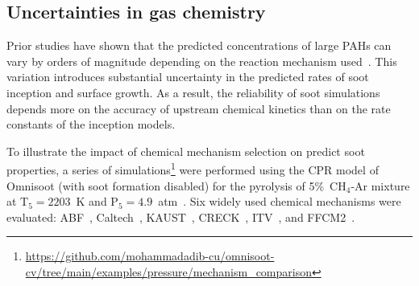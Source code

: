 \subsection{Uncertainties in gas chemistry}
\label{sec:uncergaschem}
Prior studies have shown that the predicted concentrations of large PAHs can vary by orders of magnitude depending on the reaction mechanism used~\citep{wang2023systematic}. This variation introduces substantial uncertainty in the predicted rates of soot inception and surface growth. As a result, the reliability of soot simulations depends more on the accuracy of upstream chemical kinetics than on the rate constants of the inception models.

To illustrate the impact of chemical mechanism selection on predict soot properties, a series of simulations\footnote{\href{https://github.com/mohammadadib-cu/omnisoot-cv/tree/main/examples/pressure/mechanism_comparison}{https://github.com/mohammadadib-cu/omnisoot-cv/tree/main/examples/pressure/mechanism\_comparison}} were performed using the CPR model of Omnisoot (with soot formation disabled) for the pyrolysis of 5\%~$\mathrm{CH_4}$-Ar mixture at $\mathrm{T_5}=2203$~K and $\mathrm{P_5}=4.9$~atm~\citep{clark2025}. Six widely used chemical mechanisms were evaluated: ABF~\citep{appel2000kinetic}, Caltech~\citep{blanquart2009chemical}, KAUST~\citep{wang2013pah}, CRECK~\citep{saggese2015kinetic}, ITV~\citep{hellmuth2024role}, and FFCM2~\citep{ZDV2023}.

